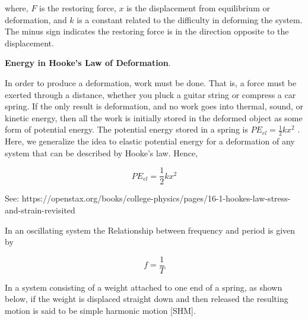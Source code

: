 \documentclass[12pt, letterpaper, twoside]{article}
\begin{document}
where,  $F$  is the restoring force,  $x$  is the displacement from equilibrium or deformation, and  $k$  is a constant related to the difficulty in deforming the system. The minus sign indicates the restoring force is in the direction opposite to the displacement.

\textbf{Energy in Hooke’s Law of Deformation}.


In order to produce a deformation, work must be done. That is, a force must be exerted through a distance, whether you pluck a guitar string or compress a car spring. If the only result is deformation, and no work goes into thermal, sound, or kinetic energy, then all the work is initially stored in the deformed object as some form of potential energy. The potential energy stored in a spring is  $PE_{el}=\frac{1}{2}kx^2$ . Here, we generalize the idea to elastic potential energy for a deformation of any system that can be described by Hooke’s law. Hence,

\begin{equation}
PE_{el} = \frac{1}{2} k x^2
\end{equation}


See: https://openstax.org/books/college-physics/pages/16-1-hookes-law-stress-and-strain-revisited

In an oscillating system the Relationship between frequency and period is given by

\begin{equation}
f = \frac{1}{T}
\end{equation}
\bigskip



In a  system consisting of a weight attached to one end of a spring, as shown below, if the weight is displaced straight down and then released the resulting motion  is said to be simple harmonic motion [SHM].
\end{document}
